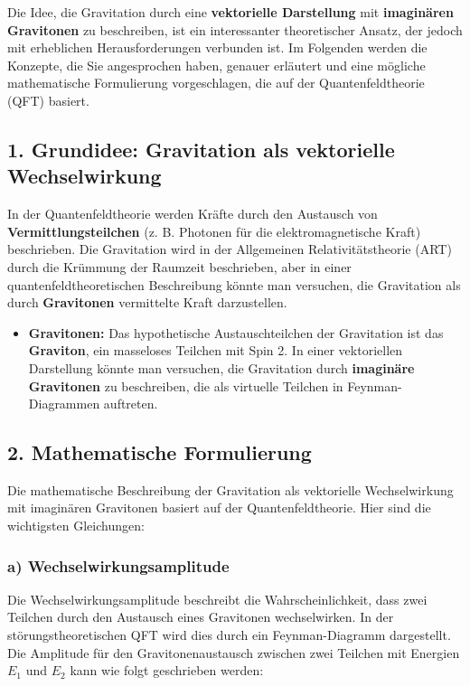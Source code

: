 \documentclass{article}
\begin{document}
Die Idee, die Gravitation durch eine \textbf{vektorielle Darstellung} mit \textbf{imaginären Gravitonen} zu beschreiben, ist ein interessanter theoretischer Ansatz, der jedoch mit erheblichen Herausforderungen verbunden ist. Im Folgenden werden die Konzepte, die Sie angesprochen haben, genauer erläutert und eine mögliche mathematische Formulierung vorgeschlagen, die auf der Quantenfeldtheorie (QFT) basiert.

\subsection{1. Grundidee: Gravitation als vektorielle Wechselwirkung}

In der Quantenfeldtheorie werden Kräfte durch den Austausch von \textbf{Vermittlungsteilchen} (z. B. Photonen für die elektromagnetische Kraft) beschrieben. Die Gravitation wird in der Allgemeinen Relativitätstheorie (ART) durch die Krümmung der Raumzeit beschrieben, aber in einer quantenfeldtheoretischen Beschreibung könnte man versuchen, die Gravitation als durch \textbf{Gravitonen} vermittelte Kraft darzustellen.

\begin{itemize}
	\item \textbf{Gravitonen:} Das hypothetische Austauschteilchen der Gravitation ist das \textbf{Graviton}, ein masseloses Teilchen mit Spin 2. In einer vektoriellen Darstellung könnte man versuchen, die Gravitation durch \textbf{imaginäre Gravitonen} zu beschreiben, die als virtuelle Teilchen in Feynman-Diagrammen auftreten.
\end{itemize}

\subsection{2. Mathematische Formulierung}

Die mathematische Beschreibung der Gravitation als vektorielle Wechselwirkung mit imaginären Gravitonen basiert auf der Quantenfeldtheorie. Hier sind die wichtigsten Gleichungen:

\subsubsection{a) Wechselwirkungsamplitude}

Die Wechselwirkungsamplitude beschreibt die Wahrscheinlichkeit, dass zwei Teilchen durch den Austausch eines Gravitonen wechselwirken. In der störungstheoretischen QFT wird dies durch ein Feynman-Diagramm dargestellt. Die Amplitude für den Gravitonenaustausch zwischen zwei Teilchen mit Energien $E_1$ und $E_2$ kann wie folgt geschrieben werden:
\end{document}
